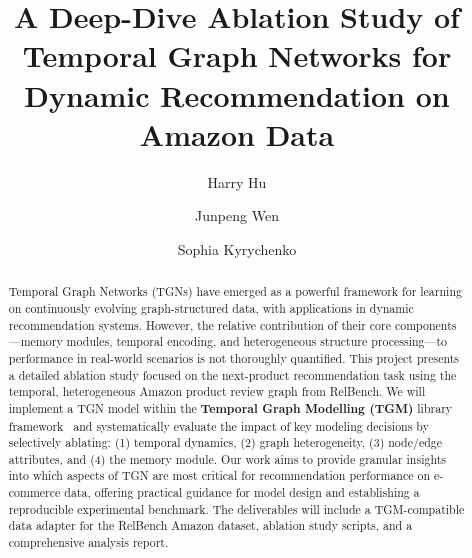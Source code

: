 \documentclass[sigconf]{acmart}
\begin{document}
\title[TGN Analysis on Amazon]{A Deep-Dive Ablation Study of Temporal Graph Networks for Dynamic Recommendation on Amazon Data}

\author{Harry Hu}

\author{Junpeng Wen}

\author{Sophia Kyrychenko}


\renewcommand{\shortauthors}{Hu, Wen, Kyrychenko}

\begin{abstract}
Temporal Graph Networks (TGNs) have emerged as a powerful framework for learning on continuously evolving graph-structured data, with applications in dynamic recommendation systems. However, the relative contribution of their core components---memory modules, temporal encoding, and heterogeneous structure processing---to performance in real-world scenarios is not thoroughly quantified. This project presents a detailed ablation study focused on the next-product recommendation task using the temporal, heterogeneous Amazon product review graph from RelBench. We will implement a TGN model within the \textbf{Temporal Graph Modelling (TGM)} library framework~\cite{chmura2025tgm} and systematically evaluate the impact of key modeling decisions by selectively ablating: (1) temporal dynamics, (2) graph heterogeneity, (3) node/edge attributes, and (4) the memory module. Our work aims to provide granular insights into which aspects of TGN are most critical for recommendation performance on e-commerce data, offering practical guidance for model design and establishing a reproducible experimental benchmark. The deliverables will include a TGM-compatible data adapter for the RelBench Amazon dataset, ablation study scripts, and a comprehensive analysis report.
\end{abstract}
\end{document}

